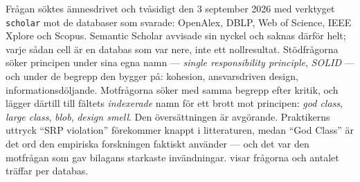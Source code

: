Frågan söktes ämnesdrivet och tvåsidigt den 3 september 2026 med
verktyget \texttt{scholar} mot de databaser som svarade: OpenAlex, DBLP,
Web of Science, IEEE Xplore och Scopus.  Semantic Scholar avvisade sin
nyckel och saknas därför helt; varje sådan cell är en databas som var
nere, inte ett nollresultat.  Stödfrågorna söker principen under sina
egna namn --- \emph{single responsibility principle}, \emph{SOLID} ---
och under de begrepp den bygger på: kohesion, ansvarsdriven design,
informationsdöljande.  Motfrågorna söker med samma begrepp efter kritik,
och lägger därtill till fältets \emph{indexerade} namn för ett brott mot
principen: \emph{god class}, \emph{large class}, \emph{blob},
\emph{design smell}.  Den översättningen är avgörande.  Praktikerns
uttryck \enquote{SRP violation} förekommer knappt i litteraturen, medan
\enquote{God Class} är det ord den empiriska forskningen faktiskt
använder --- och det var den motfrågan som gav bilagans starkaste
invändningar.   visar frågorna och antalet
träffar per databas.

